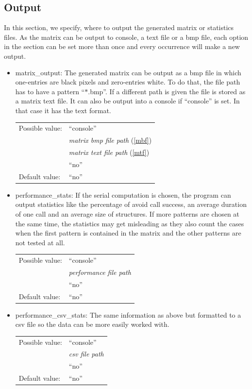\subsection{Output}
In this section, we specify, where to output the generated matrix or statistics files. As the matrix can be output to console, a text file or a bmp file, each option in the section can be set more than once and every occurrence will make a new output.
\begin{itemize}
\item matrix\_output: The generated matrix can be output as a bmp file in which one-entries are black pixels and zero-entries white. To do that, the file path has to have a pattern ``$\ast$.bmp''. If a different path is given the file is stored as a matrix text file. It can also be output into a console if ``console'' is set. In that case it has the text format.

\begin{tabular}{ll}
Possible value: & ``console'' \\
& \textit{matrix bmp file path} (\ref{mbf}) \\
& \textit{matrix text file path} (\ref{mtf}) \\
& ``no'' \\
Default value: & ``no''
\end{tabular}

\item performance\_stats: If the serial computation is chosen, the program can output statistics like the percentage of avoid call success, an average duration of one call and an average size of structures. If more patterns are chosen at the same time, the statistics may get misleading as they also count the cases when the first pattern is contained in the matrix and the other patterns are not tested at all.

\begin{tabular}{ll}
Possible value: & ``console'' \\
& \textit{performance file path} \\
& ``no'' \\
Default value: & ``no''
\end{tabular}

\item performance\_csv\_stats: The same information as above but formatted to a csv file so the data can be more easily worked with.

\begin{tabular}{ll}
Possible value: & ``console'' \\
& \textit{csv file path} \\
& ``no'' \\
Default value: & ``no''
\end{tabular}


\end{itemize}
